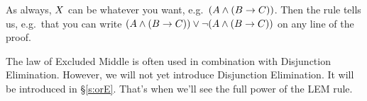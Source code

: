 
As always, $X$ can be whatever you want, e.g.~$(A\mathbin{\wedge}(B\rightarrow C))$. Then the rule tells us, e.g.~that you can write $(A\mathbin{\wedge}(B\rightarrow C))\vee\neg(A\mathbin{\wedge}(B\rightarrow C))$ on any line of the proof.


The law of Excluded Middle is often used in combination with Disjunction Elimination. 
However, we will not yet introduce Disjunction Elimination. It will be introduced in \S\ref{s:orE}. That's when we'll see the full power of the LEM rule. 


%
%
%
%
%



